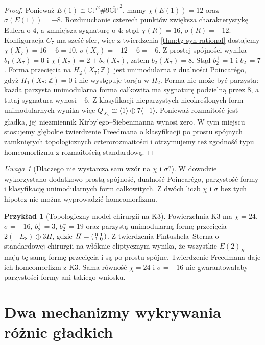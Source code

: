 \documentclass[11pt,a4paper]{report}
\numberwithin{equation}{section}
\theoremstyle{plain}
\theoremstyle{definition}
\newtheorem{przyklad}[twierdzenie]{Przykład}
\theoremstyle{remark}
\newtheorem{uwaga}[twierdzenie]{Uwaga}
\begin{document}
\begin{proof}
Ponieważ $E(1)\cong\mathbb{CP}^2\#9\overline{\mathbb{CP}}^{\,2}$,
mamy $\chi(E(1))=12$ oraz $\sigma(E(1))=-8$.
Rozdmuchanie czterech punktów zwiększa charakterystykę Eulera
o $4$, a zmniejsza sygnaturę o $4$; stąd
$\chi(R)=16$, $\sigma(R)=-12$.
Konfiguracja $C_7$ ma sześć sfer, więc
z twierdzenia \ref{thm:tg-syn-rational} dostajemy
$\chi(X_7)=16-6=10$, $\sigma(X_7)=-12+6=-6$.
Z prostej spójności wynika $b_1(X_7)=0$ i
$\chi(X_7)=2+b_2(X_7)$, zatem $b_2(X_7)=8$.
Stąd $b_2^+=1$ i $b_2^-=7$. Forma przecięcia
na $H_2(X_7;\mathbb Z)$ jest unimodularna
z dualności Poincar\'ego, gdyż $H_1(X_7;\mathbb Z)=0$
i nie występuje torsja w $H_2$.
Forma nie może być parzysta: każda parzysta unimodularna
forma całkowita ma sygnaturę podzielną przez $8$,
a tutaj sygnatura wynosi $-6$. Z klasyfikacji nieparzystych
nieokreślonych form unimodularnych wynika więc
$Q_{X_7}\cong\langle1\rangle\oplus7\langle-1\rangle$.
Ponieważ rozmaitość jest gładka, jej niezmiennik
Kirby'ego--Siebenmanna wynosi zero. W tym miejscu stosujemy
głębokie twierdzenie Freedmana o klasyfikacji po prostu spójnych
zamkniętych topologicznych czterorozmaitości i otrzymujemy
też zgodność typu homeomorfizmu z rozmaitością standardową.
\end{proof}

\begin{uwaga}[Dlaczego nie wystarcza sam wzór na $\chi$ i $\sigma$?]
W dowodzie wykorzystano dodatkowo prostą spójność, dualność
Poincar\'ego, parzystość formy i klasyfikację unimodularnych
form całkowitych. Z dwóch liczb $\chi$ i $\sigma$ bez tych
hipotez nie można wyprowadzić homeomorfizmu.
\end{uwaga}

\begin{przyklad}[Topologiczny model chirurgii na K3]
Powierzchnia K3 ma $\chi=24$, $\sigma=-16$,
$b_2^+=3$, $b_2^-=19$ oraz parzystą unimodularną
formę przecięcia $2(-E_8)\oplus3H$, gdzie
$H=\begin{psmallmatrix}0&1\\1&0\end{psmallmatrix}$.
Z twierdzenia Fintushela--Sterna o standardowej chirurgii
na włóknie eliptycznym wynika, że wszystkie $E(2)_K$
mają tę samą formę przecięcia i są po prostu spójne.
Twierdzenie Freedmana daje ich homeomorfizm z K3.
Sama równość $\chi=24$ i $\sigma=-16$ nie gwarantowałaby
parzystości formy ani takiego wniosku.
\end{przyklad}

\section{Dwa mechanizmy wykrywania różnic gładkich}
\label{sec:tg-syn-sw}
\end{document}
